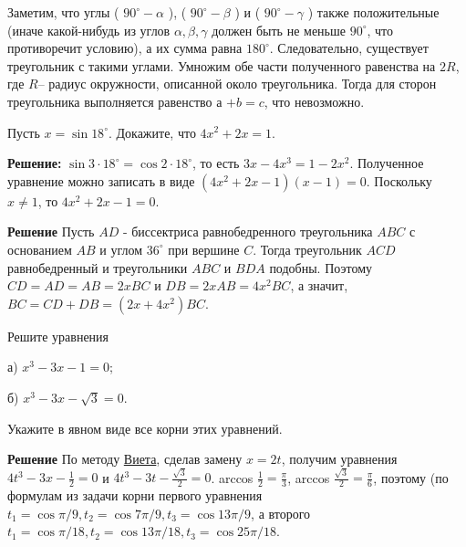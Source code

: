 Заметим, что углы ( $90^{\circ}-\alpha$ ), ( $90^{\circ}-\beta$ ) и ( $90^{\circ}-\gamma$ ) также положительные (иначе какой-нибудь из углов $\alpha, \beta, \gamma$ должен быть не меньше $90^{\circ}$, что противоречит условию), а их сумма равна $180^{\circ}$. Следовательно, существует треугольник с такими углами. Умножим обе части полученного равенства на $2 R$, где $R$-- радиус окружности, описанной около треугольника. Тогда для сторон треугольника выполняется равенство а $+b=c$, что невозможно.

Пусть $x=\sin 18^{\circ}$. Докажите, что $4 x^2+2 x=1$.

\textbf{Решение:}
$\sin 3 \cdot 18^{\circ}=\cos 2 \cdot 18^{\circ}$, то есть $3 x-4 x^3=1-2 x^2$. Полученное уравнение можно записать в виде $\left(4 x^2+2 x-1\right)(x-1)=0$. Поскольку $x \neq 1$, то $4 x^2+2 x-1=0$.

\textbf{Решение}
Пусть $A D$ - биссектриса равнобедренного треугольника $A B C$ с основанием $A B$ и углом $36^{\circ}$ при вершине $C$. Тогда треугольник $A C D$ равнобедренный и треугольники $A B C$ и $B D A$ подобны. Поэтому $C D= A D=A B=2 x B C$ и $D B=2 x A B=4 x^2 B C$, а значит, $B C=C D+D B=\left(2 x+4 x^2\right) B C$.


Решите уравнения

а) $x^3-3 x-1=0$;

б) $x^3-3 x-\sqrt{3}=0$.

Укажите в явном виде все корни этих уравнений.

\textbf{Решение}
По методу \href{https://problems.ru/view_problem_details_new.php?id=61275}{Виета}, сделав замену $x=2 t$, получим уравнения $4 t^3-3 x-\frac{1}{2}=0$ и $4 t^3-3 t-\frac{\sqrt{3}}{2}=0$. arccos $\frac{1}{2}=\frac{\pi}{3}$, arccos $\frac{\sqrt{3}}{2}=\frac{\pi}{6}$, поэтому (по формулам из задачи корни первого уравнения
$t_1=\cos \pi / 9, t_2=\cos 7 \pi / 9, t_3=\cos 13 \pi / 9$, а второго $t_1=\cos \pi / 18, t_2=\cos 13 \pi / 18, t_3=\cos 25 \pi / 18$.